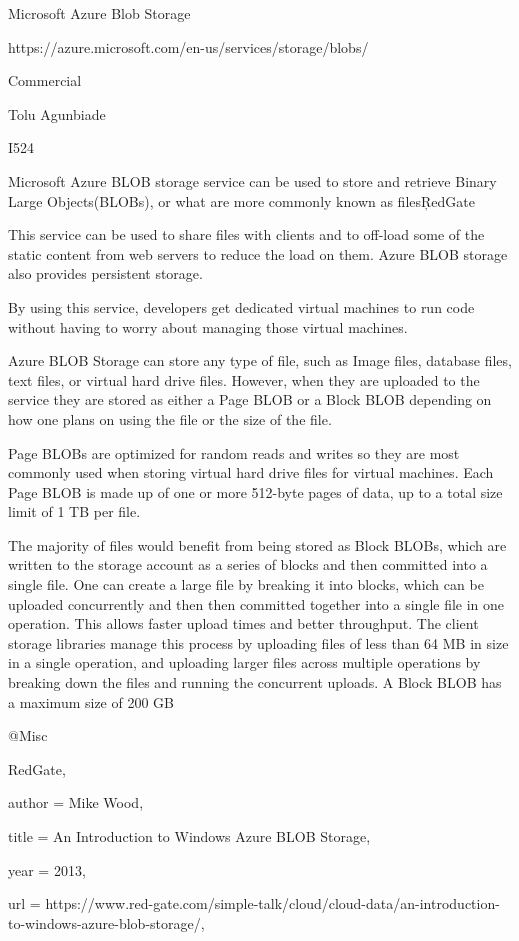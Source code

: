 Microsoft Azure Blob Storage

https://azure.microsoft.com/en-us/services/storage/blobs/

Commercial

Tolu Agunbiade

I524

Microsoft Azure BLOB storage service can be used to store and retrieve Binary Large Objects(BLOBs), or what are more commonly known as files\c{RedGate}

This service can be used to share files with clients and to off-load some of the static content from web servers to reduce the load on them. Azure BLOB storage also provides persistent storage. 

By using this service, developers get dedicated virtual machines to run code without having to worry about managing those virtual machines. 

Azure BLOB Storage can store any type of file, such as Image files, database files, text files, or virtual hard drive files. However, when they are uploaded to the service they are stored as either a Page BLOB or a Block BLOB depending on how one plans on using the file or the size of the file.

Page BLOBs are optimized for random reads and writes so they are most commonly used when storing virtual hard drive files for virtual machines. Each Page BLOB is made up of one or more 512-byte pages of data, up to a total size limit of 1 TB per file.

The majority of files would benefit from being stored as Block BLOBs, which are written to the storage account as a series of blocks and then committed into a single file. One can create a large file by breaking it into blocks, which can be uploaded concurrently and then then committed together into a single file in one operation. This allows faster upload times and better throughput. The client storage libraries manage this process by uploading files of less than 64 MB in size in a single operation, and uploading larger files across multiple operations by breaking down the files and running the concurrent uploads. A Block BLOB has a maximum size of 200 GB\cite{RedGate}

@Misc{RedGate,

  author = {Mike Wood},

  title  = {An Introduction to Windows Azure BLOB Storage},

  year   = {2013},

url = {https://www.red-gate.com/simple-talk/cloud/cloud-data/an-introduction-to-windows-azure-blob-storage/},

}
